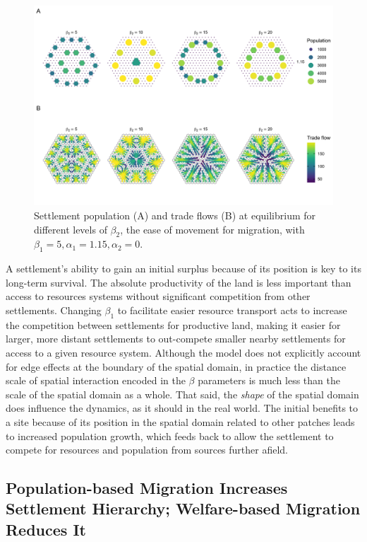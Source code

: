 \documentclass{article}
\begin{document}
\begin{figure}
    \centering
    \includegraphics[width = \linewidth]{images/beta2.png}
    \caption[Settlement population (A) and trade flows (B) at equilibrium for different levels of $\beta_2$]{Settlement population (A) and trade flows (B) at equilibrium for different levels of $\beta_2$, the ease of movement for migration, with $\beta_1 = 5, \alpha_1 = 1.15, \alpha_2 = 0$.}
    \label{fig:beta2}
\end{figure}

A settlement's ability to gain an initial surplus because of its position is key to its long-term survival. The absolute productivity of the land is less important than access to resources systems without significant competition from other settlements. Changing $\beta_1$ to facilitate easier resource transport acts to increase the competition between settlements for productive land, making it easier for larger, more distant settlements to out-compete smaller nearby settlements for access to a given resource system. Although the model does not explicitly account for edge effects at the boundary of the spatial domain, in practice the distance scale of spatial interaction encoded in the $\beta$ parameters is much less than the scale of the spatial domain as a whole. That said, the \emph{shape} of the spatial domain does influence the dynamics, as it should in the real world. The initial benefits to a site because of its position in the spatial domain related to other patches leads to increased population growth, which feeds back to allow the settlement to compete for resources and population from sources further afield. 

\subsection{Population-based Migration Increases Settlement Hierarchy; Welfare-based Migration Reduces It}
\end{document}
